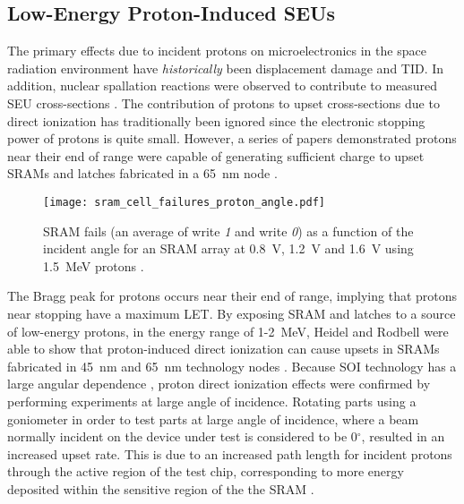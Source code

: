 \subsection{Low-Energy Proton-Induced SEUs} %
\label{sub:low_energy_proton_induced_seus}
The primary effects due to incident protons on microelectronics in the space radiation environment have \emph{historically} been displacement damage and TID.
In addition, nuclear spallation reactions were observed to contribute to measured SEU cross-sections \cite{Heidel:2008vf}.
The contribution of protons to upset cross-sections due to direct ionization has traditionally been ignored since the electronic stopping power of protons is quite small.
However, a series of papers demonstrated protons near their end of range were capable of generating sufficient charge to upset SRAMs and latches fabricated in a 65~nm node \cite{Heidel:2006tp,Heidel:2008vf,Heidel:2009vx,Rodbell:2007vl,Sierawski:2009ka}.

\begin{figure}[htbp]
    \begin{center}
        \texttt{[image: sram\_cell\_failures\_proton\_angle.pdf]}
    \end{center}
    \caption[SRAM fails (an average of write \emph{1} and write \emph{0}) as a function of the incident angle for an SRAM array at 0.8~V, 1.2~V and 1.6~V using 1.5~MeV protons.]{SRAM fails (an average of write \emph{1} and write \emph{0}) as a function of the incident angle for an SRAM array at 0.8~V, 1.2~V and 1.6~V using 1.5~MeV protons \cite{Rodbell:2007vl}.}
    \label{fig:sram_proton_angle_dep}
\end{figure}

The Bragg peak for protons occurs near their end of range, implying that protons near stopping have a maximum LET.
By exposing SRAM and latches to a source of low-energy protons, in the energy range of 1-2~MeV, Heidel and Rodbell were able to show that proton-induced direct ionization can cause upsets in SRAMs fabricated in 45~nm and 65~nm technology nodes \cite{Heidel:2006tp,Rodbell:2007vl,Heidel:2009vx}.
Because SOI technology has a large angular dependence \cite{Reed:2002wn}, proton direct ionization effects were confirmed by performing experiments at large angle of incidence.
Rotating parts using a goniometer in order to test parts at large angle of incidence, where a beam normally incident on the device under test is considered to be 0$^\circ$, resulted in an increased upset rate.
This is due to an increased path length for incident protons through the active region of the test chip, corresponding to more energy deposited within the sensitive region of the the SRAM \cite{Heidel:2006tp}.

